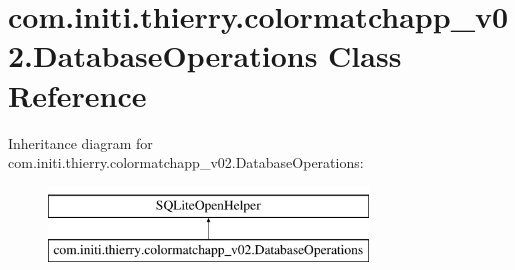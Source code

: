 \hypertarget{classcom_1_1initi_1_1thierry_1_1colormatchapp__v02_1_1_database_operations}{}\section{com.\+initi.\+thierry.\+colormatchapp\+\_\+v02.\+Database\+Operations Class Reference}
\label{classcom_1_1initi_1_1thierry_1_1colormatchapp__v02_1_1_database_operations}
Inheritance diagram for com.\+initi.\+thierry.\+colormatchapp\+\_\+v02.\+Database\+Operations\+:\begin{figure}[H]
\begin{center}
\leavevmode
\includegraphics[height=2.000000cm]{classcom_1_1initi_1_1thierry_1_1colormatchapp__v02_1_1_database_operations}
\end{center}
\end{figure}
